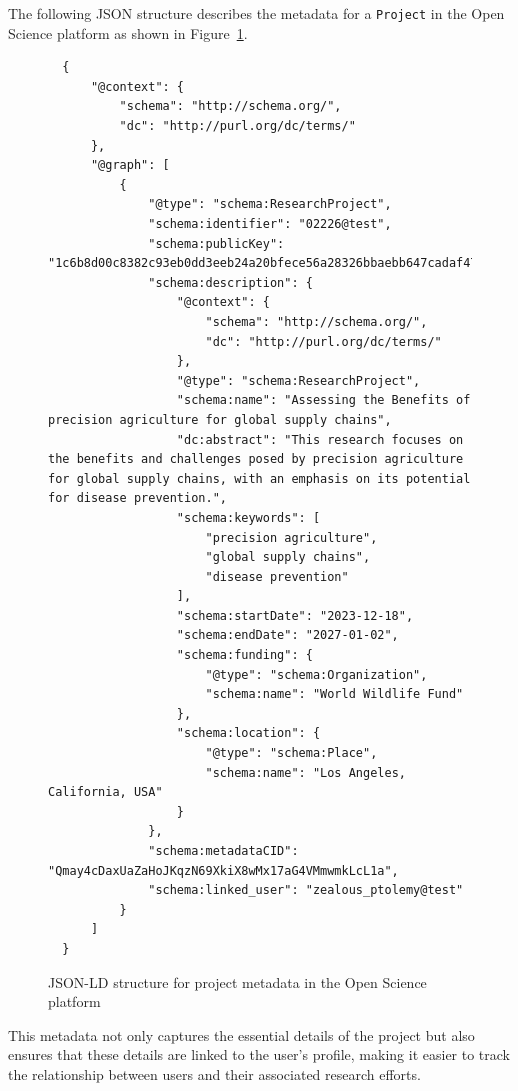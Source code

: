 \documentclass{article}
\begin{document}
The following JSON structure describes the metadata for a \texttt{Project} in the Open Science platform as shown in Figure~\ref{jsonld:project}.


\begin{figure}[h]
      \centering
      \caption{JSON-LD structure for project metadata in the Open Science platform}
      \label{jsonld:project}
      \begin{verbatim}
  {
      "@context": {
          "schema": "http://schema.org/",
          "dc": "http://purl.org/dc/terms/"
      },
      "@graph": [
          {
              "@type": "schema:ResearchProject",
              "schema:identifier": "02226@test",
              "schema:publicKey": "1c6b8d00c8382c93eb0dd3eeb24a20bfece56a28326bbaebb647cadaf4750520",
              "schema:description": {
                  "@context": {
                      "schema": "http://schema.org/",
                      "dc": "http://purl.org/dc/terms/"
                  },
                  "@type": "schema:ResearchProject",
                  "schema:name": "Assessing the Benefits of precision agriculture for global supply chains",
                  "dc:abstract": "This research focuses on the benefits and challenges posed by precision agriculture for global supply chains, with an emphasis on its potential for disease prevention.",
                  "schema:keywords": [
                      "precision agriculture",
                      "global supply chains",
                      "disease prevention"
                  ],
                  "schema:startDate": "2023-12-18",
                  "schema:endDate": "2027-01-02",
                  "schema:funding": {
                      "@type": "schema:Organization",
                      "schema:name": "World Wildlife Fund"
                  },
                  "schema:location": {
                      "@type": "schema:Place",
                      "schema:name": "Los Angeles, California, USA"
                  }
              },
              "schema:metadataCID": "Qmay4cDaxUaZaHoJKqzN69XkiX8wMx17aG4VMmwmkLcL1a",
              "schema:linked_user": "zealous_ptolemy@test"
          }
      ]
  }
  \end{verbatim}
\end{figure}


This metadata not only captures the essential details of the project but also ensures that these details are linked to the user's profile, making it easier to track the relationship between users and their associated research efforts.
\end{document}
